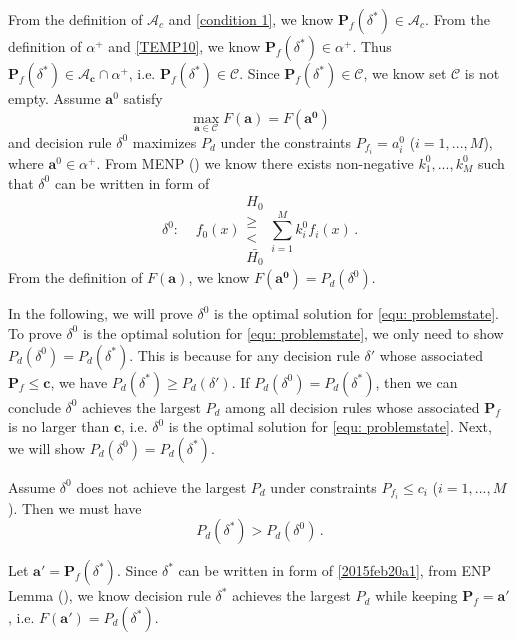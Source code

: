 From the definition of $\mathcal{A}_c$ and \eqref{condition 1}, we know $\mathbf{P}_f(\delta^\ast) \in \mathcal{A}_c$. 
From the definition of $\alpha^+$ and \eqref{TEMP10}, we know $\mathbf{P}_f(\delta^\ast) \in \alpha^+$. 
Thus $\mathbf{P}_f(\delta^\ast) \in \mathcal{A}_\mathbf{c} \cap \alpha^+$, i.e. $\mathbf{P}_f(\delta^\ast) \in \mathcal{C}$. Since  $\mathbf{P}_f(\delta^\ast) \in \mathcal{C}$, we know set $\mathcal{C}$ is not empty.
Assume $\mathbf{a}^0$ satisfy
\begin{equation}
\label{a0}
\max_{\mathbf{a}\in\mathcal{C}} F(\mathbf{a}) = F(\mathbf{a^0})
\end{equation}
and decision rule $\delta^0$ maximizes $P_d$ under the constraints $P_{f_i} = a^0_i$ ($i = 1, ..., M$), where $\mathbf{a}^0 \in \alpha^+$. From MENP () we know there exists non-negative $k_1^0, ..., k_M^0$ such that $\delta^0$ can be written in form of 
\[
\delta^0:\;\;\;\;f_0(x) \substack{H_0 \\ \geq \\ < \\ \bar{H_0}} \sum_{i=1}^{M}k_i^0f_i(x)\,.
\] 
From the definition of $F(\mathbf{a})$, we know $F(\mathbf{a^0}) = P_d(\delta^0)$.

In the following, we  will prove $\delta^0$ is the optimal solution for \eqref{equ: problemstate}.
To prove $\delta^0$ is the optimal solution for \eqref{equ: problemstate}, we only need to show $P_d(\delta^0) = P_d(\delta^\ast)$. This is because for any decision rule $\delta'$ whose associated $\mathbf{P}_f \leq \mathbf{c}$, we have $P_d(\delta^\ast) \geq P_d(\delta')$. If $P_d(\delta^0) = P_d(\delta^\ast)$, then we can conclude $\delta^0$ achieves the largest $P_d$ among all decision rules whose associated $\mathbf{P}_f$ is no larger than $\mathbf{c}$, i.e. $\delta^0$ is the optimal solution for \eqref{equ: problemstate}. Next, we will show $P_d(\delta^0) = P_d(\delta^\ast)$.   

Assume  $\delta^0$ does not achieve the largest $P_d$ under constraints $P_{f_i} \leq c_i$ ($i=1, ..., M$). Then  we must have 
\begin{equation}
\label{condition 2}
P_{d}(\delta^\ast) > P_d(\delta^0)\,.
\end{equation}

Let $\mathbf{a}' = \mathbf{P}_f(\delta^\ast)$. 
Since $\delta^\ast$ can be written in form of \eqref{2015feb20a1}, from ENP Lemma (), we know decision rule $\delta^\ast$ achieves the largest $P_d$ while keeping $\mathbf{P}_f = \mathbf{a}'$, i.e.  
$F(\mathbf{a}') = P_d(\delta^\ast)$. 

